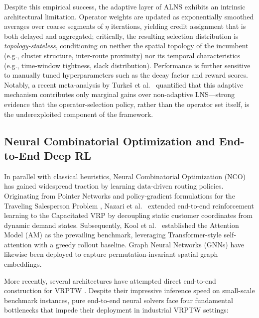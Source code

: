 Despite this empirical success, the adaptive layer of ALNS exhibits an
intrinsic architectural limitation. Operator weights are updated as
exponentially smoothed averages over coarse segments of $\eta$ iterations,
yielding credit assignment that is both delayed and aggregated; critically,
the resulting selection distribution is \emph{topology-stateless}, conditioning on
neither the spatial topology of the incumbent (e.g., cluster structure,
inter-route proximity) nor its temporal characteristics (e.g., time-window
tightness, slack distribution). Performance is further sensitive to manually
tuned hyperparameters such as the decay factor and reward scores. Notably, a
recent meta-analysis by Turke\v{s} et al.\ \cite{turkes2021meta} quantified
that this adaptive mechanism contributes only marginal gains over
non-adaptive LNS---strong evidence that the operator-selection policy, rather
than the operator set itself, is the underexploited component of the
framework.

\subsection{Neural Combinatorial Optimization and End-to-End Deep RL}
\label{sec:rw_nco}

In parallel with classical heuristics, Neural Combinatorial Optimization (NCO)
has gained widespread traction by learning data-driven routing policies.
Originating from Pointer Networks \cite{vinyals2015pointer} and policy-gradient
formulations for the Traveling Salesperson Problem \cite{bello2016neural},
Nazari et al.\ \cite{nazari2018reinforcement} extended end-to-end reinforcement
learning to the Capacitated VRP by decoupling static customer coordinates from
dynamic demand states. Subsequently, Kool et al.\ \cite{kool2019attention}
established the Attention Model (AM) as the prevailing benchmark, leveraging
Transformer-style self-attention with a greedy rollout baseline. Graph Neural
Networks (GNNs) \cite{khalil2017learning, joshi2019efficient} have likewise been
deployed to capture permutation-invariant spatial graph embeddings.

More recently, several architectures have attempted direct end-to-end
construction for VRPTW \cite{falkner2020learning, lin2021deep}. Despite their
impressive inference speed on small-scale benchmark instances, pure
end-to-end neural solvers face four fundamental bottlenecks that impede their
deployment in industrial VRPTW settings:

